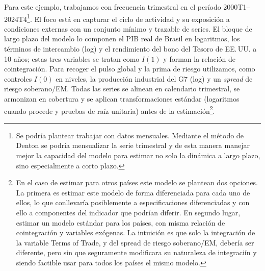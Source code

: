 \documentclass[11pt,a4paper]{article}
\numberwithin{equation}{section}
\begin{document}
Para este ejemplo, trabajamos con frecuencia trimestral en el período 2000T1–2024T4\footnote{Se podría plantear trabajar con datos mensuales. Mediante el método de Denton se podría mensualizar la serie trimestral y de esta manera manejar mejor la capacidad del modelo para estimar no solo la dinámica a largo plazo, sino especialmente a corto plazo.}. El foco está en capturar el ciclo de actividad y su exposición a condiciones externas con un conjunto mínimo y trazable de series. El bloque de largo plazo del modelo lo componen el PIB real de Brasil en logaritmos, los términos de intercambio (log) y el rendimiento del bono del Tesoro de EE.\,UU. a 10 años; estas tres variables se tratan como $I(1)$ y forman la relación de cointegración. Para recoger el pulso global y la prima de riesgo utilizamos, como controles $I(0)$ en niveles, la producción industrial del G7 (log) y un \textit{spread} de riesgo soberano/EM. Todas las series se alinean en calendario trimestral, se armonizan en cobertura y se aplican transformaciones estándar (logaritmos cuando procede y pruebas de raíz unitaria) antes de la estimación\footnote{En el caso de estimar para otros países este modelo se plantean dos opciones. La primera es estimar este modelo de forma diferenciada para cada uno de ellos, lo que conllevaría posiblemente a especificaciones diferenciadas y con ello a componentes del indicador que podrían diferir. En segundo lugar, estimar un modelo estándar para los países, con misma relación de cointegración y variables exógenas. La intuición es que solo la integración de la variable Terms of Trade, y del spread de riesgo soberano/EM, debería ser diferente, pero sin que seguramente modificara su naturaleza de integraciín y siendo factible usar para todos los países el mismo modelo.}.
\end{document}
